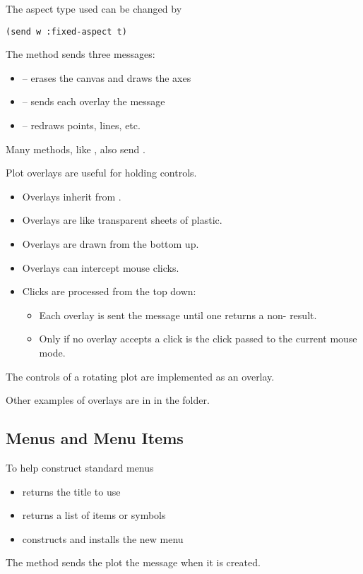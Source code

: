 \begin{slide}{}
The aspect type used can be changed by
\begin{verbatim}
(send w :fixed-aspect t)
\end{verbatim}
The  method sends three messages:
\begin{itemize}
\item
{} -- erases the canvas and draws the axes
\item 
{} -- sends each overlay the  message
\item
{} -- redraws points, lines, etc.
\end{itemize}
Many methods, like , also send .

\end{slide}

\begin{slide}{}
Plot overlays are useful for holding controls.
\begin{itemize}
\item Overlays inherit from .
\item Overlays are like transparent sheets of plastic.
\item Overlays are drawn from the bottom up.
\item Overlays can intercept mouse clicks.
\item Clicks are processed from the top down:
\begin{itemize}
\item
Each overlay is sent the  message until one returns a
non- result.
\item
Only if no overlay accepts a click is the click passed to the current
mouse mode.
\end{itemize}
\end{itemize}
The controls of a rotating plot are implemented as an overlay.

Other examples of overlays are in  in the
 folder.
\end{slide}

\begin{slide}{}
\subsection{Menus and Menu Items}
To help construct standard menus
\begin{itemize}
\item {} returns the title to use
\item {} returns a list of items or symbols
\item {} constructs and installs the new menu
\end{itemize}
The  method sends the plot the 
message when it is created.
\end{slide}

